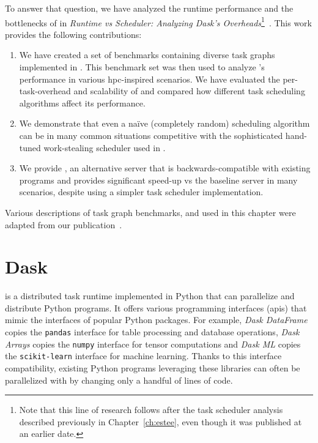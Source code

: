 To answer that question, we have analyzed the runtime performance and the bottlenecks of
\dask{} in
\emph{Runtime vs Scheduler: Analyzing Dask's Overheads}\footnote{Note that this line of research follows after the task scheduler analysis described previously in
Chapter~\ref{ch:estee}, even though it was published at an earlier date.}~\cite{rsds}. This work
provides the following contributions:
\begin{enumerate}
	\item We have created a set of benchmarks containing diverse task graphs implemented in
	      \dask{}. This benchmark set was then used to analyze \dask{}'s
	      performance in various \gls{hpc}-inspired scenarios. We have evaluated the
	      per-task-overhead and scalability of \dask{} and compared how different task
	      scheduling algorithms affect its performance.
	\item We demonstrate that even a naïve (completely random) scheduling algorithm can be in many common
	      situations competitive with the sophisticated hand-tuned work-stealing scheduler used in
	      \dask{}.
	\item We provide \rsds{}, an alternative \dask{} server that is
	      backwards-compatible with existing \dask{} programs and provides significant
	      speed-up vs the baseline \dask{} server in many scenarios, despite using a
	      simpler task scheduler implementation.
\end{enumerate}

Various descriptions of task graph benchmarks, \dask{} and
\rsds{} used in this chapter were adapted from our
publication~\cite{rsds}.


\section{Dask}
\label{sec:rsds-dask}
\dask{} is a distributed task runtime implemented in Python that can
parallelize and distribute Python programs. It offers various programming interfaces
(\glspl{api}) that mimic the interfaces of popular Python packages. For example,
\emph{Dask DataFrame} copies the \texttt{pandas}
interface for table processing and database operations, \emph{Dask Arrays} copies the
\texttt{numpy} interface for tensor computations and
\emph{Dask ML} copies the \texttt{scikit-learn}
interface for machine learning. Thanks to this interface compatibility, existing Python programs
leveraging these libraries can often be parallelized with \dask{} by changing
only a handful of lines of code.

